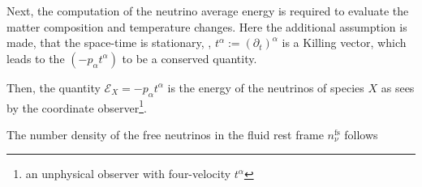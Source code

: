 

Next, the computation of the neutrino average energy is 
required to evaluate the matter composition and temperature changes.
%
Here the additional assumption is made, that the space-time is stationary, \eg, 
$t^{\alpha}:=(\partial_t)^{\alpha}$ is a Killing vector, which leads to the 
$(-p_{\alpha}t^{\alpha})$ to be a conserved quantity.
%
%

Then, the quantity $\mathcal{E}_X = -p_{\alpha}t^{\alpha}$ is the energy of the neutrinos 
of species $X$ as sees by the coordinate observer\footnote{an unphysical observer with four-velocity $t^{\alpha}$}.

%
%
%
%
%
%
%




The number density of the free neutrinos in the fluid rest frame $n_{\nu}^{\text{fs}}$ follows \cite{Radice:2016dwd}

